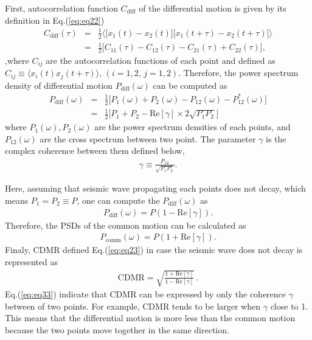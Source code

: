 First, autocorrelation function $C_{\mathrm{diff}}$ of the differential motion is given by its definition in Eq.(\ref{eq:eq22})
\begin{eqnarray}
  C_{\mathrm{diff}}(\tau) &=& \frac{1}{2}
  \biggl\langle
  \biggl[ x_{1}(t)-x_{2}(t) \biggr] \biggl[ x_{1}(t+\tau)-x_{2}(t+\tau) \biggr]
  \biggr\rangle \\
  &=& \frac{1}{2}\biggl[ C_{11}(\tau) - C_{12}(\tau) - C_{21}(\tau) + C_{22}(\tau) \biggr], 
\end{eqnarray}
,where $C_{ij}$ are the autocorrelation functions of each point and defined as $ C_{ij} \equiv \langle x_{i}(t)x_{j}(t+\tau)\rangle,\, (i=1,2,\,j=1,2)$. Therefore, the power spectrum density of differential motion $P_{\mathrm{diff}}(\omega)$ can be computed as
\begin{eqnarray}
  P_{\mathrm{diff}}(\omega) &=& \frac{1}{2}\biggl[ P_{1}(\omega) + P_{2}(\omega) - P_{12}(\omega) - P_{12}^*(\omega) \biggr]\\
  &=& \frac{1}{2} \biggl[ P_{1}+P_{2} - \mathrm{Re}\left[\gamma \right]\times2\sqrt{P_{1}P_{2}} \biggr] \label{eq:eq31}
\end{eqnarray}
where $P_{1}(\omega),P_{2}(\omega)$ are the power spectrum densities of each points, and $P_{12}(\omega)$ are the cross spectrum between two point. The parameter $\gamma$ is the complex coherence between them defined below,
\begin{eqnarray}
  \gamma \equiv \frac{P_{12}}{\sqrt{P_{1}P_{2}}}.
\end{eqnarray}

Here, assuming that seismic wave propagating each points does not decay, which means $P_{1}=P_{2} \equiv P$, one can compute the $P_{\mathrm{diff}}(\omega)$ as 
\begin{eqnarray}
  P_{\mathrm{diff}}(\omega) = P (1-\mathrm{Re}\left[\gamma\right]).
\end{eqnarray}
Therefore, the PSDs of the common motion can be calculated as
\begin{eqnarray}
  P_{\mathrm{comm}}(\omega) = P (1+\mathrm{Re}\left[\gamma\right]).
\end{eqnarray}
Finaly, CDMR defined Eq.(\ref{eq:eq23}) in case the seismic wave does not decay is represented as
\begin{eqnarray}
 \mathrm{CDMR} = \sqrt{\frac{1 + \mathrm{Re} \left[\gamma \right] }{1 - \mathrm{Re} \left[\gamma \right]}}\,. \label{eq:eq33}
\end{eqnarray}
Eq.(\ref{eq:eq33}) indicate that CDMR can be expressed by only the coherence $\gamma$ between of two points. For example, CDMR tends to be larger when $\gamma$ close to 1. This means that the differential motion is more less than the common motion because the two points move together in the same direction.


